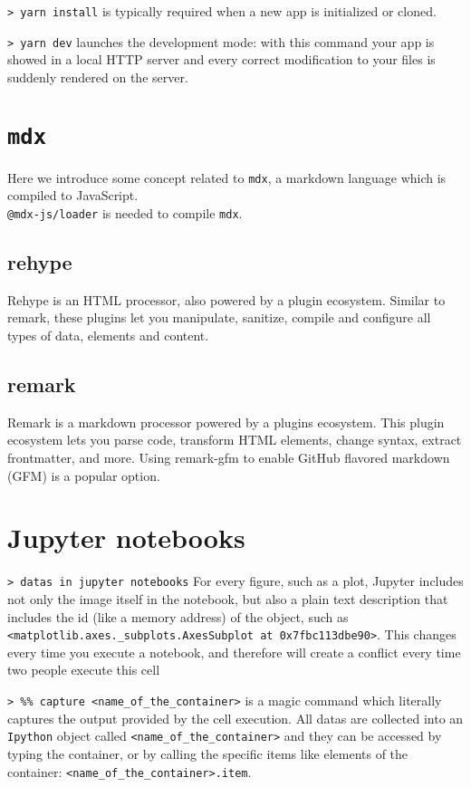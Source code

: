 \documentclass[11pt]{article}
\newcommand{\cmd}[1]{\colorbox{light-gray}{\textcolor{gio}{\texttt{#1}}}}
\begin{document}
\begin{multicols}{2}
\cmd{> yarn install} is typically required when a new app is initialized or cloned.

\cmd{> yarn dev} launches the development mode: with this command your app is
showed in a local HTTP server and every correct modification to your files is
suddenly rendered on the server.

\section{\texttt{mdx}}

Here we introduce some concept related to \texttt{mdx}, a markdown language which 
is compiled to JavaScript. \\

\cmd{@mdx-js/loader} is needed to compile \texttt{mdx}.

\subsection{rehype}

Rehype is an HTML processor, also powered by a plugin ecosystem. Similar to remark, 
these plugins let you manipulate, sanitize, compile and configure all types of data, 
elements and content.

\subsection{remark}

Remark is a markdown processor powered by a plugins ecosystem. This plugin ecosystem 
lets you parse code, transform HTML elements, change syntax, extract frontmatter, 
and more. Using remark-gfm to enable GitHub flavored markdown (GFM) is a popular option.

\section{Jupyter notebooks}

\cmd{> datas in jupyter notebooks} For every figure, such as a plot, Jupyter 
includes not only the image itself in the notebook, but also a plain text description 
that includes the id (like a memory address) of the object, such as 
\texttt{<matplotlib.axes.\_subplots.AxesSubplot at 0x7fbc113dbe90>}. 
This changes every time you execute a notebook, and therefore will create a 
conflict every time two people execute this cell

\cmd{> \%\% capture <name\_of\_the\_container>} is a magic command which literally 
captures the output provided by the cell execution. All datas are collected into 
an \texttt{Ipython} object called \texttt{<name\_of\_the\_container>} and they 
can be accessed by typing the container, or by calling the specific items like
 elements of the container: \texttt{<name\_of\_the\_container>.item}. 



\end{multicols}
\end{document}
